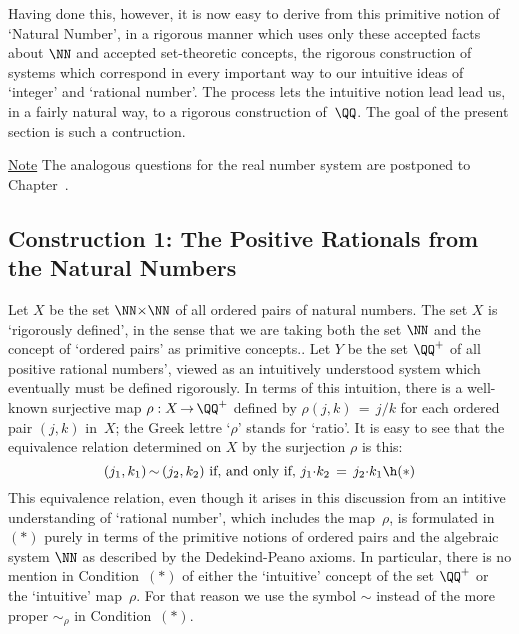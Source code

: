         Having done this, however, it is now easy to derive from this primitive notion of `Natural Number',
    in a rigorous manner which uses only these accepted facts about ${\NN}$ and accepted set-theoretic concepts,
    the rigorous construction of systems which correspond in every important way to our intuitive ideas of `integer' and `rational number'.
    The process lets the intuitive notion lead lead us, in a fairly natural way, to a rigorous construction of~${\QQ}$.
    The goal of the present section is such a contruction.

\V

    \underline{Note} The analogous questions for the real number system are postponed to Chapter~.

\VV



        \subsection{\small{{\bf Construction 1: The Positive Rationals from the Natural Numbers}}}
                \label{ConstA50.130A}

 \V

        Let $X$ be the set ${\NN}{\times}{\NN}$ of all ordered pairs of natural numbers.
    The set $X$ is `rigorously defined', in the sense that we are taking both the set ${\NN}$ and the concept of `ordered pairs' as primitive concepts..
    Let $Y$ be the set ${\QQ}^{+}$ of all positive rational numbers', viewed as an intuitively understood system which eventually must be defined rigorously. 
    In terms of this intuition, there is a well-known surjective map ${\rho}:X \,{\rightarrow}\, {\QQ}^{+}$ defined by
    ${\rho}(j,k) \,=\, j/k$ for each ordered pair $(j,k)$ in~$X$; the Greek lettre `${\rho}$' stands for `ratio'.
    It is easy to see that the equivalence relation determined on $X$ by the surjection ${\rho}$ is this:
        \begin{displaymath}
        (j_{1},k_{1}) \,{\sim}\, (j_{2}, k_{2}) \mbox{ if, and only if, }
        j_{1}{\cdot}k_{2} \,=\, j_{2}{\cdot}k_{1} \h ({\ast})
        \end{displaymath}
    This equivalence relation, even though it arises in this discussion from an intitive understanding of `rational number', which includes the map~${\rho}$,
    is formulated in~$({\ast})$ purely in terms of the primitive notions of ordered pairs and the algebraic system ${\NN}$ as described by the Dedekind-Peano axioms.
    In particular, there is no mention in Condition~$({\ast})$ of either the `intuitive' concept of the set ${\QQ}^{+}$ or the `intuitive' map~${\rho}$.
    For that reason we use the symbol ${\sim}$ instead of the more proper ${\sim}_{{\rho}}$ in Condition~$({\ast})$.

